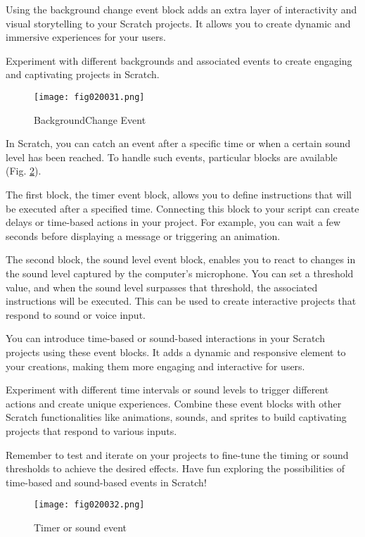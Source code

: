 Using the background change event block adds an extra layer of interactivity and visual storytelling to your Scratch projects. It allows you to create dynamic and immersive experiences for your users.

Experiment with different backgrounds and associated events to create engaging and captivating projects in Scratch.

\begin{figure}[H]
   \centering
   \texttt{[image: fig020031.png]}
   \caption{BackgroundChange Event}
\label{fig020031}
\end{figure}

In Scratch, you can catch an event after a specific time or when a certain sound level has been reached. To handle such events, particular blocks are available (Fig. \ref{fig020032}).

The first block, the timer event block, allows you to define instructions that will be executed after a specified time. Connecting this block to your script can create delays or time-based actions in your project. For example, you can wait a few seconds before displaying a message or triggering an animation.

The second block, the sound level event block, enables you to react to changes in the sound level captured by the computer's microphone. You can set a threshold value, and when the sound level surpasses that threshold, the associated instructions will be executed. This can be used to create interactive projects that respond to sound or voice input.

You can introduce time-based or sound-based interactions in your Scratch projects using these event blocks. It adds a dynamic and responsive element to your creations, making them more engaging and interactive for users.

Experiment with different time intervals or sound levels to trigger different actions and create unique experiences. Combine these event blocks with other Scratch functionalities like animations, sounds, and sprites to build captivating projects that respond to various inputs.

Remember to test and iterate on your projects to fine-tune the timing or sound thresholds to achieve the desired effects. Have fun exploring the possibilities of time-based and sound-based events in Scratch!

\begin{figure}[H]
   \centering
   \texttt{[image: fig020032.png]}
   \caption{Timer or sound event}
\label{fig020032}
\end{figure}

